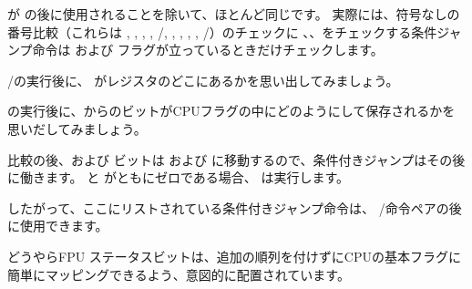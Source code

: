 ﻿




\JA が \SAHF の後に使用されることを除いて、ほとんど同じです。 
実際には、符号なしの番号比較（これらは \JA , \JAE , \JB , \JBE , \JE/\JZ , \JNA , \JNAE , \JNB , \JNBE , \JNE/\JNZ ）のチェックに
、、をチェックする条件ジャンプ命令は \CF および \ZF フラグが立っているときだけチェックします。

/\FNSTSW の実行後に、 \CThreeBits がレジスタのどこにあるかを思い出してみましょう。



\SAHF の実行後に、からのビットがCPUフラグの中にどのようにして保存されるかを思いだしてみましょう。



比較の後、\Cthree および \Czero ビットは \ZF および \CF に移動するので、条件付きジャンプはその後に働きます。 \CF と \ZF がともにゼロである場合、 \JA は実行します。

したがって、ここにリストされている条件付きジャンプ命令は、 \FNSTSW/\SAHF 命令ペアの後に使用できます。

どうやらFPU \CThreeBits ステータスビットは、追加の順列を付けずにCPUの基本フラグに簡単にマッピングできるよう、意図的に配置されています。
